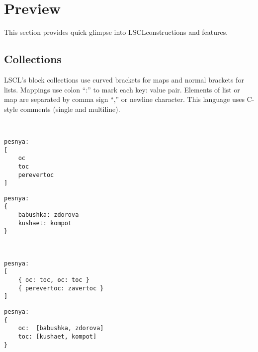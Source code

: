 
\section{Preview}
This section provides quick glimpse into LSCLconstructions and features.

\subsection{Collections}
LSCL's block collections use curved brackets for maps and normal brackets for lists. Mappings use colon ``:'' to mark each key: value pair. Elements of list or map are separated by comma sign ``,'' or newline character. This language uses C-style comments (single and multiline).

~\\
\begin{minipage}{0.45\textwidth}
\begin{lstlisting}[caption = list]
pesnya:
[
	oc
	toc
	perevertoc
]
\end{lstlisting}
\end{minipage}
\hfill
\begin{minipage}{0.45\textwidth}
\begin{lstlisting}[caption = map]
pesnya:
{
	babushka: zdorova
	kushaet: kompot
}
\end{lstlisting}
\end{minipage}

~\\
\begin{minipage}{0.45\textwidth}
\begin{lstlisting}[caption = list of maps]
pesnya:
[
	{ oc: toc, oc: toc }
	{ perevertoc: zavertoc }
]
\end{lstlisting}
\end{minipage}
\hfill
\begin{minipage}{0.45\textwidth}
\begin{lstlisting}[caption = map of lists]
pesnya:
{
	oc:  [babushka, zdorova]
	toc: [kushaet, kompot]
}
\end{lstlisting}
\end{minipage}

